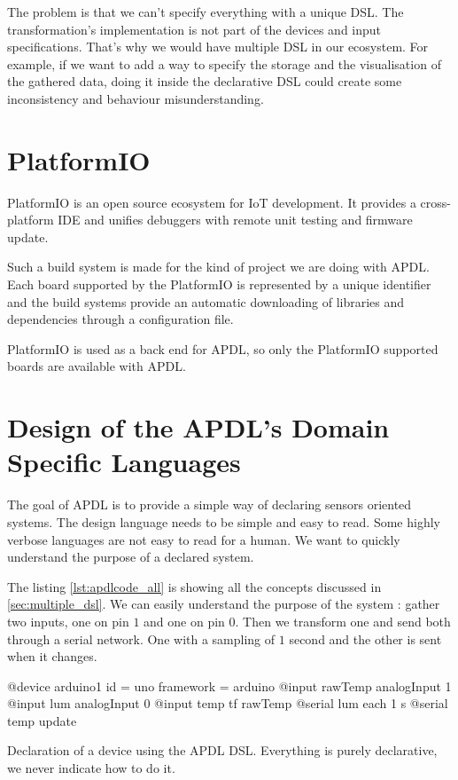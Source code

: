 The problem is that we can't specify everything with a unique \gls{DSL}. The
transformation's implementation is not part of the devices and input
specifications. That's why we would have multiple \gls{DSL} in our ecosystem.
For example, if we want to add a way to specify the storage and the
visualisation of the gathered data, doing it inside the declarative \gls{DSL}
could create some inconsistency and behaviour misunderstanding.

\section{PlatformIO}
\label{sec:platformio}

PlatformIO\cite{Ivan2017} is an open source ecosystem for IoT development. It
provides a cross-platform IDE and unifies debuggers with remote unit testing and
firmware update\cite{Ivan2017}.

Such a build system is made for the kind of project we are doing with
\gls{APDL}. Each board supported by the PlatformIO is represented by a unique
identifier and the build systems provide an automatic downloading of libraries
and dependencies through a configuration file.

PlatformIO is used as a back end for \gls{APDL}, so only the PlatformIO
supported boards are available with \gls{APDL}.

\section{Design of the APDL's Domain Specific Languages}
\label{sec:design_apdl_dsls}

The goal of \gls{APDL} is to provide a simple way of declaring sensors oriented
systems. The design language needs to be simple and easy to read. Some highly
verbose languages are not easy to read for a human. We want to quickly
understand the purpose of a declared system.

The listing \ref{lst:apdlcode_all} is showing all the concepts discussed in
\ref{sec:multiple_dsl}. We can easily understand the purpose of the system :
gather two inputs, one on pin $1$ and one on pin $0$. Then we transform one and
send both through a serial network. One with a sampling of $1$ second and the
other is sent when it changes.

\begin{listing}[H]
  \centering
\begin{apdlcode}
@device arduino1 {
    id = uno
    framework = arduino
    @input rawTemp analogInput 1
    @input lum analogInput 0
    @input temp tf rawTemp
    @serial lum each 1 s
    @serial temp update
}
\end{apdlcode}
  \caption[Declaration of a device with the \gls{APDL} \gls{DSL}]{Declaration of
  a device using the \gls{APDL} \gls{DSL}. Everything is purely declarative, we
  never indicate how to do it.}
  \label{lst:apdlcode_all}
\end{listing}

